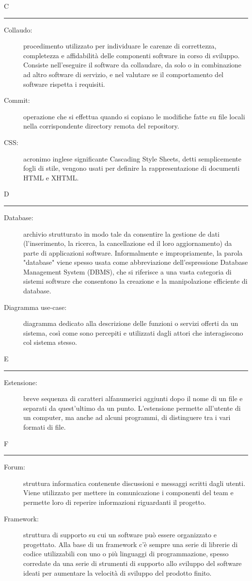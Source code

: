 \documentclass[11pt,a4paper]{article}
\begin{document}
\bigskip
\Huge C \bigskip
\hrule
\smallskip
\normalsize
\begin{description}
	\item[Collaudo:] procedimento utilizzato per individuare le carenze di correttezza, completezza e affidabilità delle componenti software in corso di sviluppo. Consiste nell'eseguire il software da collaudare, da solo o in combinazione ad altro software di servizio, e nel valutare se il comportamento del software rispetta i requisiti.
	\item[Commit:] operazione che si effettua quando si copiano le modifiche fatte su file locali nella corrispondente directory remota del repository.
	\item[CSS:] acronimo inglese significante Cascading Style Sheets, detti semplicemente fogli di stile, vengono usati per definire la rappresentazione di documenti HTML e XHTML.
\end{description}
\bigskip
\Huge D \bigskip
\hrule
\smallskip
\normalsize
\begin{description}
	\item[Database:] archivio strutturato in modo tale da consentire la gestione de dati (l'inserimento, la ricerca, la cancellazione ed il loro aggiornamento) da parte di applicazioni software. Informalmente e impropriamente, la parola "database" viene spesso usata come abbreviazione dell'espressione Database Management System (DBMS), che si riferisce a una vasta categoria di sistemi software che consentono la creazione e la manipolazione efficiente di database.
	\item[Diagramma use-case:] diagramma dedicato alla descrizione delle funzioni o servizi offerti da un sistema, così come sono percepiti e utilizzati dagli attori che interagiscono col sistema stesso.
\end{description}
\bigskip
\Huge E \bigskip
\hrule
\smallskip
\normalsize
\begin{description}
	\item[Estensione:] breve sequenza di caratteri alfanumerici aggiunti dopo il nome di un file e separati da quest'ultimo da un punto. L'estensione permette all'utente di un computer, ma anche ad alcuni programmi, di distinguere tra i vari formati di file.
\end{description}
\bigskip
\Huge F \bigskip
\hrule
\smallskip
\normalsize
\begin{description}
	\item[Forum:] struttura informatica contenente discussioni e messaggi scritti dagli utenti. Viene utilizzato per mettere in comunicazione i componenti del team e permette loro di reperire informazioni riguardanti il progetto.
	\item[Framework:] struttura di supporto su cui un software può essere organizzato e progettato. Alla base di un framework c'è sempre una serie di librerie di codice utilizzabili con uno o più linguaggi di programmazione, spesso corredate da una serie di strumenti di supporto allo sviluppo del software ideati per aumentare la velocità di sviluppo del prodotto finito.
\end{description}
\end{document}
